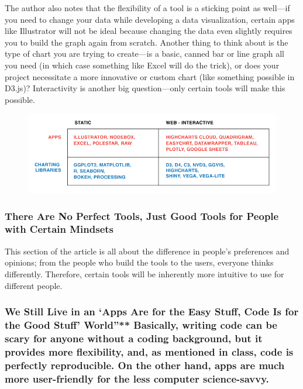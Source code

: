 \documentclass[]{book}
\theoremstyle{definition}
\theoremstyle{definition}
\theoremstyle{definition}
\theoremstyle{remark}
\begin{document}
The author also notes that the flexibility of a tool is a sticking point
as well---if you need to change your data while developing a data
visualization, certain apps like Illustrator will not be ideal because
changing the data even slightly requires you to build the graph again
from scratch. Another thing to think about is the type of chart you are
trying to create---is a basic, canned bar or line graph all you need (in
which case something like Excel will do the trick), or does your project
necessitate a more innovative or custom chart (like something possible
in D3.js)? Interactivity is another big question---only certain tools
will make this possible.

\begin{figure}
\centering
\includegraphics{images/interactivity.png}
\caption{}
\end{figure}

\subsubsection{There Are No Perfect Tools, Just Good Tools for People
with Certain
Mindsets}\label{there-are-no-perfect-tools-just-good-tools-for-people-with-certain-mindsets}

This section of the article is all about the difference in people's
preferences and opinions; from the people who build the tools to the
users, everyone thinks differently. Therefore, certain tools will be
inherently more intuitive to use for different people.

\subsubsection{\texorpdfstring{We Still Live in an `Apps Are for the
Easy Stuff, Code Is for the Good Stuff' World''** Basically, writing
code can be scary for anyone without a coding background, but it
provides more flexibility, and, as mentioned in class, code is perfectly
reproducible. On the other hand, apps are much more user-friendly for
the less computer
science-savvy.}{We Still Live in an Apps Are for the Easy Stuff, Code Is for the Good Stuff World''** Basically, writing code can be scary for anyone without a coding background, but it provides more flexibility, and, as mentioned in class, code is perfectly reproducible. On the other hand, apps are much more user-friendly for the less computer science-savvy.}}\label{we-still-live-in-an-apps-are-for-the-easy-stuff-code-is-for-the-good-stuff-world-basically-writing-code-can-be-scary-for-anyone-without-a-coding-background-but-it-provides-more-flexibility-and-as-mentioned-in-class-code-is-perfectly-reproducible.-on-the-other-hand-apps-are-much-more-user-friendly-for-the-less-computer-science-savvy.}
\end{document}
